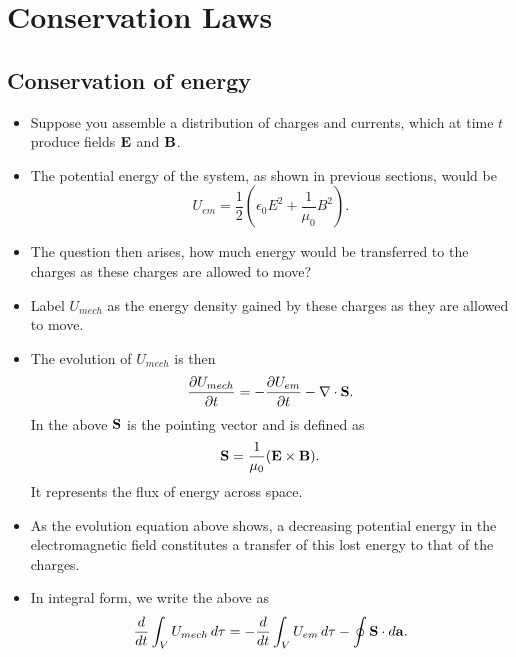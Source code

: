 \documentclass[11pt]{article}
\begin{document}
\section{Conservation Laws}
\subsection{Conservation of energy}
\begin{itemize}
    \item Suppose you assemble a distribution of charges and currents, which at time $t$ produce fields $\mathbf{E}$ and $\mathbf{B}$.
    \item The potential energy of the system, as shown in previous sections, would be
    \begin{equation}
        U_{em} = \frac{1}{2} \left ( \epsilon_0 E^2 + \frac{1}{\mu_0} B^2 \right ).
    \end{equation}
    \item The question then arises, how much energy would be transferred to the charges as these charges are allowed to move?
    \item Label $U_{mech}$ as the energy density gained by these charges as they are allowed to move.
    \item The evolution of $U_{mech}$ is then
    \begin{equation}
        \frac{\partial U_{mech}}{\partial t} = -\frac{\partial U_{em}}{\partial t} - \nabla \cdot \mathbf{S}.
    \end{equation}
    In the above $\mathbf{S}$ is the pointing vector and is defined as 
    \begin{equation}
        \mathbf{S} = \frac{1}{\mu_0} ( \mathbf{E} \times \mathbf{B} ).
    \end{equation}
    It represents the flux of energy across space.
    \item As the evolution equation above shows, a decreasing potential energy in the electromagnetic field constitutes a transfer of this lost energy to that of the charges. 
    \item In integral form, we write the above as 
    \begin{equation}
        \frac{d}{dt} \int_V U_{mech} \, d\tau = -\frac{d}{dt} \int_V U_{em} \, d\tau - \oint \mathbf{S} \cdot d\mathbf{a}.
    \end{equation}
\end{itemize}
\end{document}
